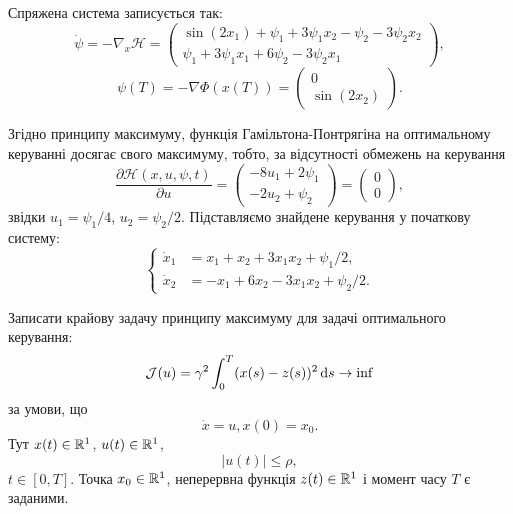 \begin{solution}
    Спряжена система записується так:
    \begin{equation} 
        \dot \psi = - \nabla_x \mathcal{H} = \begin{pmatrix} \sin (2 x_1) + \psi_1 + 3 \psi_1 x_2 - \psi_2 - 3 \psi_2 x_2 \\ \psi_1 + 3 \psi_1 x_1 + 6 \psi_2 - 3 \psi_2 x_1 \end{pmatrix},
    \end{equation}
    \begin{equation} 
        \psi(T) = - \nabla \Phi(x(T)) = \begin{pmatrix} 0 \\ \sin (2 x_2) \end{pmatrix}.
    \end{equation} 
    
    Згідно принципу максимуму, функція Гамільтона-Понтрягіна на оптимальному керуванні досягає свого максимуму, тобто, за відсутності обмежень на керування
    \begin{equation} 
        \dfrac{\partial \mathcal{H}(x, u, \psi, t)}{\partial u} = \begin{pmatrix} - 8 u_1 + 2 \psi_1 \\ - 2 u_2 + \psi_2 \end{pmatrix} = \begin{pmatrix} 0 \\ 0 \end{pmatrix},
    \end{equation}
    звідки $u_1 = \psi_1 / 4$, $u_2 = \psi_2 / 2$. Підставляємо знайдене керування у початкову систему:
    \[ \left\{ \begin{aligned}
        \dot x_1 &= x_1 + x_2 + 3 x_1 x_2 + \psi_1 / 2, \\
        \dot x_2 &= - x_1 + 6 x_2 - 3 x_1 x_2 + \psi_2 / 2.
    \end{aligned} \right. \]
\end{solution}

\begin{problem}
    Записати крайову задачу принципу максимуму для задачі оптимального керування:
    \begin{equation*}
        \mathcal{J}(u) = \gamma^2 \int_0^T (x(s) - z(s))^2 \mathop{}\!\mathrm{d} s \to \inf
    \end{equation*}
    за умови, що
    \begin{equation*}
        \dot x = u, x(0) = x_0.
    \end{equation*}
    Тут $x(t) \in \mathbb{R}^1$, $u(t) \in \mathbb{R}^1$,
    \begin{equation*}
        |u(t)| \le \rho,
    \end{equation*}
    $t \in [0, T]$. Точка $x_0 \in \mathbb{R}^1$, неперервна функція $z(t) \in \mathbb{R}^1$ і момент часу $T$ є заданими.
\end{problem}


